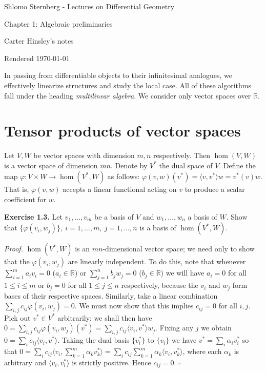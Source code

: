 \documentclass[a4paper]{article}
\newcommand{\R}{\mathbb{R}}
\begin{document}
\begin{center}
\LARGE{Shlomo Sternberg - Lectures on Differential Geometry}

\Large{Chapter 1: Algebraic preliminaries}

\large{Carter Hinsley's notes}

Rendered \today
\end{center}

In passing from differentiable objects to their infinitesimal analogues, we effectively linearize structures and study the local case. All of these algorithms fall under the heading \emph{multilinear algebra}. We consider only vector spaces over $\R$.

\section{Tensor products of vector spaces}

Let $V, W$ be vector spaces with dimension $m, n$ respectively. Then $\hom(V, W)$ is a vector space of dimension $mn$. Denote by $V^*$ the dual space of $V$. Define the map $\varphi : V \times W \to \hom(V^*, W)$ as follows: $\varphi(v, w)(v^*) = \langle v, v^* \rangle w = v^*(v) w$. That is, $\varphi(v, w)$ accepts a linear functional acting on $v$ to produce a scalar coefficient for $w$.

\textbf{Exercise 1.3.} Let $v_1, \ldots, v_m$ be a basis of $V$ and $w_1, \ldots, w_n$ a basis of $W$. Show that $\{\varphi(v_i, w_j)\},\ i = 1, \ldots, m,\ j = 1, \ldots, n$ is a basis of $\hom(V^*, W)$.

\emph{Proof.} $\hom(V^*, W)$ is an $mn$-dimensional vector space; we need only to show that the $\varphi(v_i, w_j)$ are linearly independent. To do this, note that whenever $\sum_{i=1}^m a_iv_i = 0$ ($a_i \in \R$) or $\sum_{j=1}^n b_jw_j = 0$ ($b_j \in \R$) we will have $a_i = 0$ for all $1 \leq i \leq m$ or $b_j = 0$ for all $1 \leq j \leq n$ respectively, because the $v_i$ and $w_j$ form bases of their respective spaces. Similarly, take a linear combination $\sum_{i, j} c_{ij} \varphi(v_i, w_j) = 0$. We must now show that this implies $c_{ij} = 0$ for all $i, j$. Pick out $v^* \in V^*$ arbitrarily; we shall then have $0 = \sum_{i, j} c_{ij}\varphi(v_i, w_j)(v^*) = \sum_{i, j} c_{ij}\langle v_i, v^* \rangle w_j$. Fixing any $j$ we obtain $0 = \sum_i c_{ij} \langle v_i, v^* \rangle$. Taking the dual basis $\{v_i^*\}$ to $\{v_i\}$ we have $v^* = \sum_i \alpha_iv_i^*$ so that $0 = \sum_i c_{ij} \langle v_i, \sum_{k=1}^m \alpha_k v_k^* \rangle = \sum_i c_{ij} \sum_{k=1}^m \alpha_k \langle v_i, v_k^* \rangle$, where each $\alpha_k$ is arbitrary and $\langle v_i, v_i^* \rangle$ is strictly positive. Hence $c_{ij} = 0$. $\square$
\end{document}
